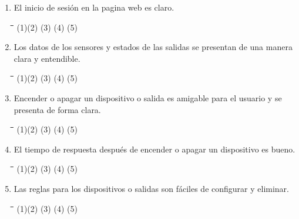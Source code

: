 \begin{appendix}
\begin{enumerate}
	\item El inicio de sesión en la pagina web es claro.
	
\begin{tabbing}
	\hspace{2cm}\=\hspace{2cm}\=\hspace{2cm}\=\hspace{2cm}\=\kill
	(1)\>(2)  \>(3)  \>(4)  \>(5) 
\end{tabbing} 

	\item Los datos de los sensores y estados de las salidas se presentan de una manera clara y entendible.

\begin{tabbing}
	\hspace{2cm}\=\hspace{2cm}\=\hspace{2cm}\=\hspace{2cm}\=\kill
	(1)\>(2)  \>(3)  \>(4)  \>(5) 
\end{tabbing} 
	
	\item Encender o apagar un dispositivo o salida es amigable para el usuario y se presenta de forma clara.
	
\begin{tabbing}
	\hspace{2cm}\=\hspace{2cm}\=\hspace{2cm}\=\hspace{2cm}\=\kill
	(1)\>(2)  \>(3)  \>(4)  \>(5) 
\end{tabbing} 

	\item El tiempo de respuesta después de encender o apagar un dispositivo es bueno.

	\begin{tabbing}
		\hspace{2cm}\=\hspace{2cm}\=\hspace{2cm}\=\hspace{2cm}\=\kill
		(1)\>(2)  \>(3)  \>(4)  \>(5) 
	\end{tabbing} 

	\item Las reglas para los dispositivos o salidas son fáciles de configurar y eliminar.

\begin{tabbing}
	\hspace{2cm}\=\hspace{2cm}\=\hspace{2cm}\=\hspace{2cm}\=\kill
	(1)\>(2)  \>(3)  \>(4)  \>(5) 
\end{tabbing} 


\end{enumerate}
\end{appendix}

